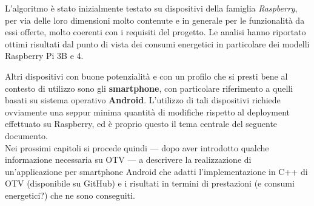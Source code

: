 L'algoritmo è stato inizialmente testato su dispositivi della famiglia \textit{Raspberry}, per via delle loro dimensioni molto
contenute e in generale per le funzionalità da essi offerte, molto coerenti con i requisiti del progetto. Le analisi \cite{app11157027} 
hanno riportato ottimi risultati dal punto di vista dei consumi energetici in particolare dei modelli Raspberry Pi 3B e 4. 

Altri dispositivi con buone potenzialità e con un profilo che si presti bene al contesto di utilizzo sono gli \textbf{smartphone},
con particolare riferimento a quelli basati su sistema operativo \textbf{Android}. L'utilizzo di tali dispositivi richiede ovviamente
una seppur minima quantità di modifiche rispetto al deployment effettuato su Raspberry, ed è proprio questo il tema centrale
del seguente documento.\\
Nei prossimi capitoli si procede quindi --- dopo aver introdotto qualche informazione necessaria su OTV --- a descrivere 
la realizzazione di un'applicazione per smartphone Android che adatti l'implementazione in C++ di OTV (disponibile su GitHub)
e i risultati in termini di prestazioni (e consumi energetici?) che ne sono conseguiti.




\clearpage{\pagestyle{empty}\cleardoublepage}